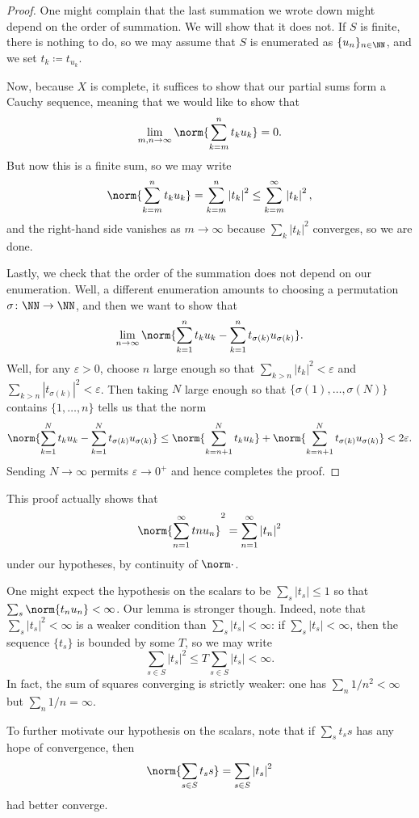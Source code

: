 \documentclass[../notes.tex]{subfiles}
\begin{document}
\begin{proof}
	One might complain that the last summation we wrote down might depend on the order of summation. We will show that it does not. If $S$ is finite, there is nothing to do, so we may assume that $S$ is enumerated as $\{u_n\}_{n\in\NN}$, and we set $t_k\coloneqq t_{u_k}$.

	Now, because $X$ is complete, it suffices to show that our partial sums form a Cauchy sequence, meaning that we would like to show that
	\[\lim_{m,n\to\infty}\norm{\sum_{k=m}^nt_ku_k}=0.\]
	But now this is a finite sum, so we may write
	\[\norm{\sum_{k=m}^nt_ku_k}=\sum_{k=m}^n\left|t_k\right|^2\le\sum_{k=m}^\infty\left|t_k\right|^2,\]
	and the right-hand side vanishes as $m\to\infty$ because $\sum_k\left|t_k\right|^2$ converges, so we are done.
	
	Lastly, we check that the order of the summation does not depend on our enumeration. Well, a different enumeration amounts to choosing a permutation $\sigma\colon\NN\to\NN$, and then we want to show that
	\[\lim_{n\to\infty}\norm{\sum_{k=1}^nt_ku_k-\sum_{k=1}^nt_{\sigma(k)}u_{\sigma(k)}}.\]
	Well, for any $\varepsilon>0$, choose $n$ large enough so that $\sum_{k>n}\left|t_k\right|^2<\varepsilon$ and $\sum_{k>n}\left|t_{\sigma(k)}\right|^2<\varepsilon$. Then taking $N$ large enough so that $\{\sigma(1),\ldots,\sigma(N)\}$ contains $\{1,\ldots,n\}$ tells us that the norm
	\[\norm{\sum_{k=1}^Nt_ku_k-\sum_{k=1}^Nt_{\sigma(k)}u_{\sigma(k)}}\le\norm{\sum_{k=n+1}^Nt_ku_k}+\norm{\sum_{k=n+1}^Nt_{\sigma(k)}u_{\sigma(k)}}<2\varepsilon.\]
	Sending $N\to\infty$ permits $\varepsilon\to0^+$ and hence completes the proof.
\end{proof}
\begin{remark} \label{rem:norm-of-series}
	This proof actually shows that
	\[\norm{\sum_{n=1}^\infty tnu_n}^2=\sum_{n=1}^\infty\left|t_n\right|^2\]
	under our hypotheses, by continuity of $\norm\cdot$.
\end{remark}
\begin{remark}
	One might expect the hypothesis on the scalars to be $\sum_s\left|t_s\right|\le1$ so that $\sum_s\norm{t_nu_n}<\infty$. Our lemma is stronger though. Indeed, note that $\sum_s\left|t_s\right|^2<\infty$ is a weaker condition than $\sum_s\left|t_s\right|<\infty$: if $\sum_s\left|t_s\right|<\infty$, then the sequence $\{t_s\}$ is bounded by some $T$, so we may write
	\[\sum_{s\in S}\left|t_s\right|^2\le T\sum_{s\in S}\left|t_s\right|<\infty.\]
	In fact, the sum of squares converging is strictly weaker: one has $\sum_n1/n^2<\infty$ but $\sum_n1/n=\infty$.
\end{remark}
\begin{remark}
	To further motivate our hypothesis on the scalars, note that if $\sum_st_ss$ has any hope of convergence, then
	\[\norm{\sum_{s\in S}t_ss}=\sum_{s\in S}\left|t_s\right|^2\]
	had better converge.
\end{remark}
\end{document}
